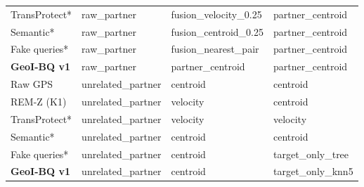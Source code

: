\begin{longtable}{@{}P{2.5cm}P{2.6cm}P{3.8cm}P{3.8cm}@{}}
TransProtect* & raw\_\allowbreak{}partner & fusion\_\allowbreak{}velocity\_\allowbreak{}0.25 & partner\_\allowbreak{}centroid \\
Semantic* & raw\_\allowbreak{}partner & fusion\_\allowbreak{}centroid\_\allowbreak{}0.25 & partner\_\allowbreak{}centroid \\
Fake queries* & raw\_\allowbreak{}partner & fusion\_\allowbreak{}nearest\_\allowbreak{}pair & partner\_\allowbreak{}centroid \\
\textbf{GeoI-BQ v1} & raw\_\allowbreak{}partner & partner\_\allowbreak{}centroid & partner\_\allowbreak{}centroid \\
Raw GPS & unrelated\_\allowbreak{}partner & centroid & centroid \\
REM-Z (K1) & unrelated\_\allowbreak{}partner & velocity & centroid \\
TransProtect* & unrelated\_\allowbreak{}partner & velocity & velocity \\
Semantic* & unrelated\_\allowbreak{}partner & centroid & centroid \\
Fake queries* & unrelated\_\allowbreak{}partner & centroid & target\_\allowbreak{}only\_\allowbreak{}tree \\
\textbf{GeoI-BQ v1} & unrelated\_\allowbreak{}partner & centroid & target\_\allowbreak{}only\_\allowbreak{}knn5 \\
\end{longtable}

\endgroup
